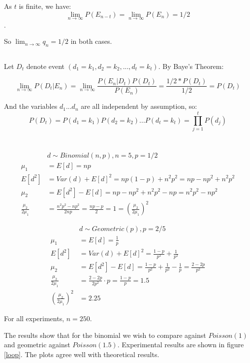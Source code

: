 \documentclass{article}
\begin{document}
As $t$ is finite, we have:
$$\lim_{n\to\infty} P(E_{n-t}) = \lim_{n\to\infty} P(E_{n})  = 1/2$$. 

So $\lim_{n\to\infty} q_n = 1/2$ in both cases.

\subsection{}
\vspace{-2ex}
Let $D_t$ denote event $(d_1 = k_1, d_2 = k_2,..., d_t = k_t)$. By Baye's Theorem:

$$ \lim_{n\to\infty} P(D_t | E_n) = \lim_{n\to\infty} \frac{P(E_n | D_t)P(D_t)}{P(E_n)} = \frac{1/2* P(D_t)}{1/2} = P(D_t) $$

And the variables $d_1...d_n$ are all independent by assumption, so:
$$P(D_t) = P(d_1 = k_1) P(d_2 = k_2) ... P(d_t = k_t) = \prod_{j=1}^{t} P(d_j)$$ 

\newpage
\section{}
\subsection{}
$$
\begin{aligned}
&d\sim Binomial(n,p),n=5,p=1/2\\
\mu_1&=E[d]=np\\
E[d^2]&=Var(d)+E[d]^2=np(1-p)+n^2p^2=np-np^2+n^2p^2\\
\mu_2&=E[d^2]-E[d]=np-np^2+n^2p^2-np=n^2p^2-np^2\\
\frac{\mu_2}{2\mu_1}&=\frac{n^2p^2-np^2}{2np}=\frac{np-p}{2}=1=(\frac{\mu_2}{2\mu_1})^2
\end{aligned}
$$

$$
\begin{aligned}
&d\sim Geometric(p),p=2/5\\
\mu_1&=E[d]=\frac{1}{p}\\
E[d^2]&=Var(d)+E[d]^2=\frac{1-p}{p^2}+\frac{1}{p^2}\\
\mu_2&=E[d^2]-E[d]=\frac{1-p}{p^2}+\frac{1}{p^2}-\frac{1}{p}=\frac{2-2p}{p^2}\\
\frac{\mu_2}{2\mu_1}&=\frac{2-2p}{2p^2}\cdot p=\frac{1-p}{p}=1.5\\
(\frac{\mu_2}{2\mu_1})^2&=2.25
\end{aligned}
$$

For all experiments, $n=250$.

The results show that for the binomial we wish to compare against $Poisson(1)$ and geometric against $Poisson(1.5)$. Experimental results are shown in figure \ref{loop}. The plots agree well with theoretical results.
\end{document}
